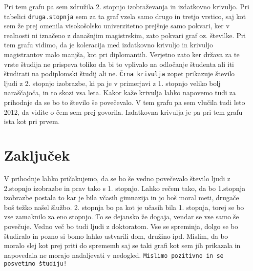 \documentclass[11pt,a4paper]{article}
\begin{document}
\begin{enumerate}
\begin{enumerate}
{ } 
 Pri tem grafu pa sem združila 2. stopnjo izobraževanja in izdatkovno krivuljo. Pri tabelici \verb|druga.stopnja| sem za ta graf vzela samo drugo in tretjo vrstico, saj kot sem že prej omenila visokošolsko univerzitetno prejšnje samo pokvari, ker v realnosti ni iznačeno z današnjim magistrskim, zato pokvari graf oz. številke. Pri tem grafu vidimo, da je koleracija med izdatkovno krivuljo in krivuljo magistrantov malo manjša, kot pri diplomantih. Verjetno zato ker država za te vrste študija ne prispeva toliko da bi to vplivalo na odločanje študenta ali iti študirati na podiplomski študij ali ne. \verb|Črna krivulja| zopet prikazuje število ljudi z 2. stopnjo izobrazbe, ki pa je v primerjavi z 1. stopnjo veliko bolj naraščajoča, in to skozi vsa leta. Kakor kaže krivulja lahko napovemo tudi za prihodnje da se bo to število še povečevalo. V tem grafu pa sem vlučila tudi leto 2012, da vidite o čem sem prej govorila. Izdatkovna krivulja je pa pri tem grafu ista kot pri prvem.
\end{enumerate}


\end{enumerate}

\section{Zaključek}

V prihodnje lahko pričakujemo, da se bo še vedno povečevalo število ljudi z 2.stopnjo izobrazbe in prav tako s 1. stopnjo. Lahko rečem tako, da bo 1.stopnja izobrazbe postala to kar je bila včasih gimnazija in jo boš moral meti, drugače boš težko našel šlužbo. 2. stopnja bo pa kot je učasih bila 1. stopnja, torej se bo vse zamaknilo za eno stopnjo. To se dejansko že dogaja, vendar se vse samo še povečuje. Vedno več bo tudi ljudi z doktoratom. Vse se spreminja, dolgo se bo študiralo in pozno si bomo lahko ustvarili dom, družino ipd. Mislim, da bo moralo slej kot prej priti do sprememb saj se taki grafi kot sem jih prikazala in napovedala ne morajo nadaljevati v nedogled. \verb|Mislimo pozitivno in se posvetimo študiju!|
\end{document}
